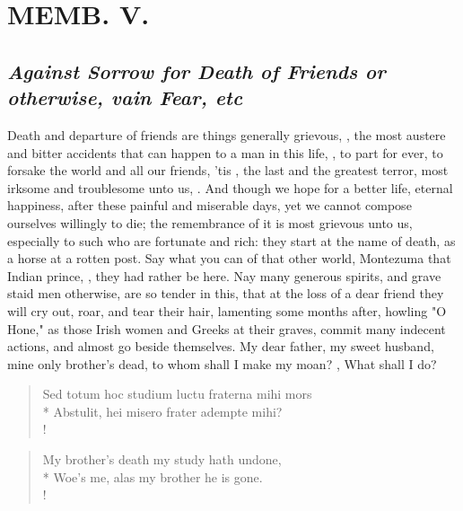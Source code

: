 {\chapter{ MEMB. V.}


\section{\emph{Against Sorrow for Death of Friends or otherwise, vain Fear, etc}}


Death and departure of friends are things generally grievous, , the most austere and bitter accidents that can happen to a man in this life, , to part for ever, to forsake the world and all our friends, 'tis , the last and the greatest terror, most irksome and troublesome unto us, . And though we hope for a better life, eternal happiness, after these painful and miserable days, yet we cannot compose ourselves willingly to die; the remembrance of it is most grievous unto us, especially to such who are fortunate and rich: they start at the name of death, as a horse at a rotten post. Say what you can of that other world, Montezuma that Indian prince, , they had rather be here. Nay many generous spirits, and grave staid men otherwise, are so tender in this, that at the loss of a dear friend they will cry out, roar, and tear their hair, lamenting some months after, howling "O Hone," as those Irish women and Greeks at their graves, commit many indecent actions, and almost go beside themselves. My dear father, my sweet husband, mine only brother's dead, to whom shall I make my moan? , \etc{} What shall I do?

%
\begin{latin}%
\begin{verse}%
Sed totum hoc studium luctu fraterna mihi mors\\*
Abstulit, hei misero frater adempte mihi?\\!
\end{verse}%
\end{latin}%
\translationrule%
\begin{verse}%
My brother's death my study hath undone,\\*
Woe's me, alas my brother he is gone.\\!
\end{verse}%

}
